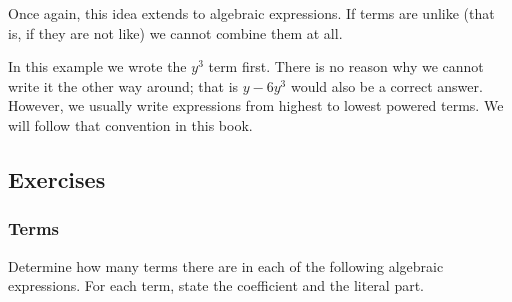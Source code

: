 Once again, this idea extends to algebraic expressions. If terms are unlike (that is, if they are not like) we cannot combine them at all.


In this example we wrote the $y^3$ term first. There is no reason why we cannot write it the other way around; that is $y-6y^3$ would also be a correct answer. However, we usually write expressions from highest to lowest powered terms. We will follow that convention in this book.


%
%

\clearpage

\subsection{Exercises}

\subsubsection*{Terms}

Determine how many terms there are in each of the following algebraic expressions. For each term, state the coefficient and the literal part.

